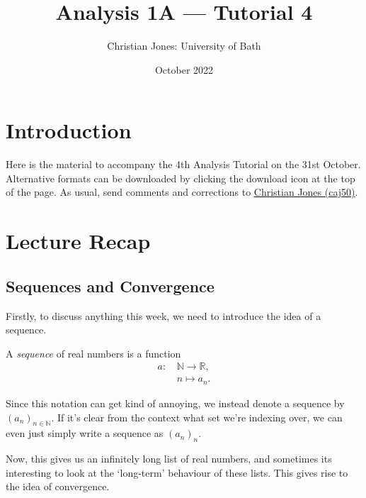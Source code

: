 \documentclass[
  12pt,
  a4paper]{extarticle}
\title{Analysis 1A --- Tutorial 4}
\author{Christian Jones: University of Bath}
\date{October 2022}
\theoremstyle{plain}
\theoremstyle{definition}
\theoremstyle{plain}
\theoremstyle{plain}
\theoremstyle{plain}
\theoremstyle{plain}
\theoremstyle{definition}
\theoremstyle{definition}
\theoremstyle{remark}
\theoremstyle{remark}
\let\BeginKnitrBlock\begin \let\EndKnitrBlock\end
\renewcommand{\;}{\,}
\begin{document}
\maketitle

{
\setcounter{tocdepth}{2}
\tableofcontents
}
\newpage
{}

\hypertarget{introduction}{%
\section*{Introduction}\label{introduction}}

Here is the material to accompany the 4th Analysis Tutorial on the 31st October. Alternative formats can be downloaded by clicking the download icon at the top of the page. As usual, send comments and corrections to \href{mailto:caj50@bath.ac.uk}{Christian Jones (caj50)}.

\hypertarget{lecture-recap}{%
\section{Lecture Recap}\label{lecture-recap}}

\hypertarget{sequences-and-convergence}{%
\subsection{Sequences and Convergence}\label{sequences-and-convergence}}

Firstly, to discuss anything this week, we need to introduce the idea of a sequence.
\BeginKnitrBlock{definition}[Sequence]
{\label{def:def1} }A \emph{sequence} of real numbers is a function
\begin{align*}
    a:\; &\mathbb{N} \longrightarrow \mathbb{R},\\
    &n \longmapsto a_n.
\end{align*}
\EndKnitrBlock{definition}
Since this notation can get kind of annoying, we instead denote a sequence by \((a_n)_{n\in\mathbb{N}}\). If it's clear from the context what set we're indexing over, we can even just simply write a sequence as \((a_n)_n\).

Now, this gives us an infinitely long list of real numbers, and sometimes its interesting to look at the `long-term' behaviour of these lists. This gives rise to the idea of convergence.
\end{document}
